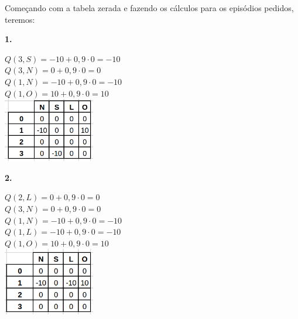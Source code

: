 \documentclass[12pt,letterpaper]{article}
\begin{document}
	Começando com a tabela zerada e fazendo os cálculos para os episódios pedidos, teremos:
	
	\textbf{1.}
	
	$Q(3,S) = -10 + 0,9 \cdot 0 = -10$\\
	$Q(3,N) = 0 + 0,9 \cdot 0 = 0$\\
	$Q(1,N) = -10 + 0,9 \cdot 0 = -10$\\
	$Q(1,O) = 10 + 0,9 \cdot 0 = 10$\\
	
	\includegraphics[width=4cm]{tabelaexperiencia1.png}
	
	\textbf{2.}
	
	$Q(2,L) = 0 + 0,9 \cdot 0 = 0$\\
	$Q(3,N) = 0 + 0,9 \cdot 0 = 0$\\
	$Q(1,N) = -10 + 0,9 \cdot 0 = -10$\\
	$Q(1,L) = -10 + 0,9 \cdot 0 = -10$\\	
	$Q(1,O) = 10 + 0,9 \cdot 0 = 10$\\
	
	\includegraphics[width=4cm]{tabelaexperiencia2.png}
	
\end{document}
